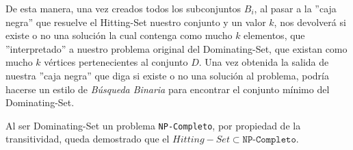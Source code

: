 De esta manera, una vez creados todos los subconjuntos $B_i$, al pasar a la ''caja negra'' que resuelve el Hitting-Set nuestro conjunto y un valor $k$, nos devolverá si existe o no una solución la cual contenga como mucho $k$ elementos, que ''interpretado'' a nuestro problema original del Dominating-Set, que existan como mucho $k$ vértices pertenecientes al conjunto $D$. Una vez obtenida la salida de nuestra ''caja negra'' que diga si existe o no una solución al problema, podría hacerse un estilo de \textit{Búsqueda Binaria} para encontrar el conjunto mínimo del Dominating-Set.

Al ser Dominating-Set un problema \texttt{NP-Completo}, por propiedad de la transitividad, queda demostrado que el $Hitting-Set \subset \texttt{NP-Completo}$.
